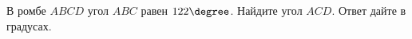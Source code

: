 \begin{ex}
	\begin{condition}
		В ромбе \( ABCD  \) угол \( ABC  \) равен \( 122\degree \). Найдите угол \( ACD \). Ответ дайте в градусах.
	\end{condition}
\end{ex}